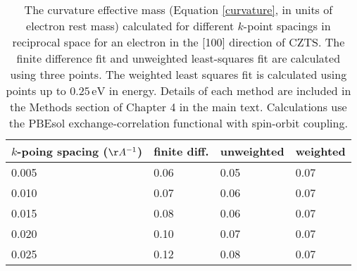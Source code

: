\begin{table}[h!] \centering 
\caption[Effective mass and $k$-point spacing]{The curvature effective mass (Equation \ref{curvature}, in units of electron rest mass) calculated for different $k$-point spacings in reciprocal space for an electron in the [100] direction of CZTS. The finite difference fit and unweighted least-squares fit are calculated using three points. The weighted least squares fit is calculated using points up to $0.25\,\mathrm{eV}$ in energy. Details of each method are included in the Methods section of Chapter 4 in the main text. Calculations use the PBEsol exchange-correlation functional with spin-orbit coupling.}
\begin{tabular}{@{}llll@{}}\toprule
$k$-poing spacing ($\AA^{-1}$) & finite diff. & unweighted  & weighted \\ 
\midrule
 0.005 & 0.06 & 0.05 & 0.07 \\
 0.010 & 0.07 & 0.06 & 0.07 \\
 0.015 & 0.08 & 0.06 & 0.07 \\
 0.020 & 0.10 & 0.07 & 0.07 \\
 0.025 & 0.12 & 0.08 & 0.07 \\
\bottomrule
\end{tabular}
\end{table}

